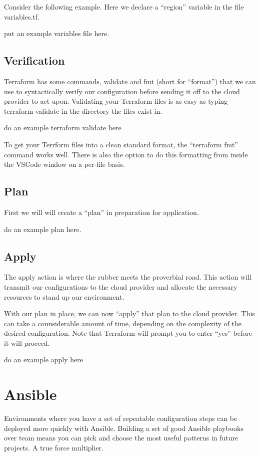 \justify{}
Consider the following example. Here we declare a ``region'' variable in
the file variables.tf.

put an example variables file here.

\subsection{Verification}

\justify{}
Terraform has some commands, validate and fmt (short for ``format'') that
we can use to syntactically verify our configuration before sending it
off to the cloud provider to act upon. Validating your Terraform files
is as easy as typing terraform validate in the directory the files exist
in.

do an example terraform validate here

To get your Terrform files into a clean standard format, the
``terraform fmt'' command works well. There is also the option to do this
formatting from inside the VSCode window on a per-file basis.

\subsection{Plan}

First we will will create a ``plan'' in preparation for application.

do an example plan here.

\subsection{Apply}

The apply action is where the rubber meets the proverbial road. This
action will transmit our configurations to the cloud provider and
allocate the necessary resources to stand up our environment.

With our plan in place, we can now ``apply'' that plan to the cloud
provider. This can take a counsiderable amount of time, depending on the
complexity of the desired configuration. Note that Terraform will prompt
you to enter ``yes'' before it will proceed.

do an example apply here

\section{Ansible}

\justify{}
Environments where you have a set of repeatable configuration steps can
be deployed more quickly with Ansible. Building a set of good Ansible
playbooks over team means you can pick and choose the most useful
patterns in future projects. A true force multiplier.

